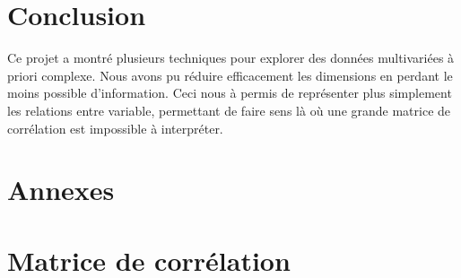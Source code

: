 \documentclass[11pt,a4paper]{article}
\begin{document}
\section{Conclusion}

Ce projet a montré plusieurs techniques pour explorer des données multivariées à priori complexe. Nous avons pu réduire efficacement les dimensions en perdant le moins possible d'information. Ceci nous à permis de représenter plus simplement les relations entre variable, permettant de faire sens là où une grande matrice de corrélation est impossible à interpréter.


\newpage
\section{Annexes}
\appendix
\section{Matrice de corrélation}
\label{sec:cor}
\end{document}
